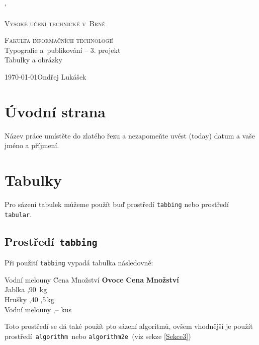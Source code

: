 \documentclass[11pt, a4paper]{article}
\begin{document}
\catcode`

\begin{titlepage}
\begin{center}
\Huge \textsc{Vysoké učení technické v~Brně}

\huge \textsc{Fakulta informačních technologií}\\
{\LARGE Typografie a~publikování -- 3. projekt\\
\Huge Tabulky a obrázky}
\end{center}
{\Large \today \hfill Ondřej Lukášek}
\end{titlepage}

\section{Úvodní strana}
Název práce umístěte do zlatého řezu a nezapomeňte uvést  (today) datum a vaše jméno a příjmení.

\section{Tabulky}
Pro sázení tabulek můžeme použít buď prostředí \verb|tabbing| nebo prostředí \verb|tabular|.

\subsection{Prostředí\texttt{ tabbing}}
Při použití \verb|tabbing| vypadá tabulka následovně:

\begin{tabbing}
    Vodní melouny \quad	\= Cena \quad \= Množství	\kill
    \textbf{Ovoce} \> \textbf{Cena} \> \textbf{Množství} \\
    Jablka ,90 \,kg \\
    Hrušky ,40 ,5\,kg \\
    Vodní melouny ,--  kus
\end{tabbing}

\noindent Toto prostředí se dá také použít pto sázení algoritmů, ovšem vhodnější je použít prostředí\verb| algorithm |nebo \verb|algorithm2e |(viz sekze \ref{Sekce3})
\end{document}
